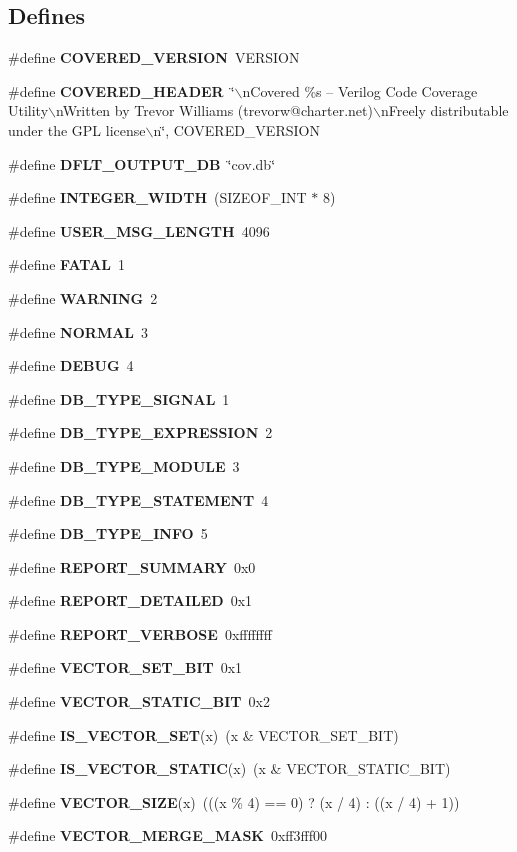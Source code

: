 \subsection*{Defines}
\begin{CompactItemize}
\item 
\#define {\bf COVERED\_\-VERSION}\ VERSION
\item 
\#define {\bf COVERED\_\-HEADER}\ \char`\"{}$\backslash$n\-Covered \%s -- Verilog Code Coverage Utility$\backslash$n\-Written by Trevor Williams  (trevorw@charter.net)$\backslash$n\-Freely distributable under the GPL license$\backslash$n\char`\"{}, COVERED\_\-VERSION
\item 
\#define {\bf DFLT\_\-OUTPUT\_\-DB}\ \char`\"{}cov.db\char`\"{}
\item 
\#define {\bf INTEGER\_\-WIDTH}\ (SIZEOF\_\-INT $\ast$ 8)
\item 
\#define {\bf USER\_\-MSG\_\-LENGTH}\ 4096
\item 
\#define {\bf FATAL}\ 1
\item 
\#define {\bf WARNING}\ 2
\item 
\#define {\bf NORMAL}\ 3
\item 
\#define {\bf DEBUG}\ 4
\item 
\#define {\bf DB\_\-TYPE\_\-SIGNAL}\ 1
\item 
\#define {\bf DB\_\-TYPE\_\-EXPRESSION}\ 2
\item 
\#define {\bf DB\_\-TYPE\_\-MODULE}\ 3
\item 
\#define {\bf DB\_\-TYPE\_\-STATEMENT}\ 4
\item 
\#define {\bf DB\_\-TYPE\_\-INFO}\ 5
\item 
\#define {\bf REPORT\_\-SUMMARY}\ 0x0
\item 
\#define {\bf REPORT\_\-DETAILED}\ 0x1
\item 
\#define {\bf REPORT\_\-VERBOSE}\ 0xffffffff
\item 
\#define {\bf VECTOR\_\-SET\_\-BIT}\ 0x1
\item 
\#define {\bf VECTOR\_\-STATIC\_\-BIT}\ 0x2
\item 
\#define {\bf IS\_\-VECTOR\_\-SET}(x)\ (x \& VECTOR\_\-SET\_\-BIT)
\item 
\#define {\bf IS\_\-VECTOR\_\-STATIC}(x)\ (x \& VECTOR\_\-STATIC\_\-BIT)
\item 
\#define {\bf VECTOR\_\-SIZE}(x)\ (((x \% 4) == 0) ? (x / 4) : ((x / 4) + 1))
\item 
\#define {\bf VECTOR\_\-MERGE\_\-MASK}\ 0xff3fff00
\item 

\end{CompactItemize}
